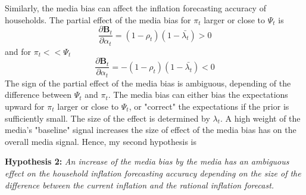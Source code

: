\documentclass[review]{elsarticle}
\begin{document}
\par
Similarly, the media bias can affect the inflation forecasting accuracy of households. The partial effect of the media bias for $\pi_t$ larger or close to $\Psi_t$ is
\begin{equation}
\frac{\partial \mathbf{B}_t}{\partial \alpha_t} = (1-\rho_t) (1-\bar{\lambda_t}) > 0 
\end{equation}
and for $\pi_t << \Psi_t$
\begin{equation}
\frac{\partial \mathbf{B}_t}{\partial \alpha_t} = -(1-\rho_t) (1-\bar{\lambda_t}) < 0 
\end{equation}
The sign of the partial effect of the media bias is ambiguous, depending of the difference between $\Psi_t$ and $\pi_t$. The media bias can either bias the expectations upward for $\pi_t$ larger or close to $\Psi_t$, or "correct" the expectations if the prior is sufficiently small. The size of the effect is determined by $\lambda_t$.  A high weight of the media's "baseline" signal increases the size of effect of the media bias has on the overall media signal. 
Hence, my second hypothesis is
\par
\textbf{Hypothesis 2:} \textit{An increase of the media bias by the media has an ambiguous effect on the household inflation forecasting accuracy depending on the size of the difference between the current inflation and the rational inflation forecast.}
\end{document}
